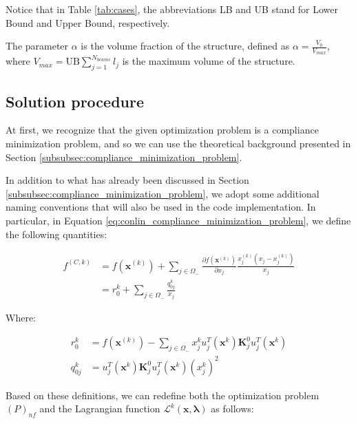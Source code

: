 Notice that in Table \ref{tab:cases}, the abbreviations LB and UB stand for Lower Bound and Upper Bound, respectively.

The parameter $\alpha$ is the volume fraction of the structure, defined as $\alpha = \frac{V_0}{V_{max}}$, where $V_{max} = \text{UB} \sum_{j=1}^{N_{beams}} l_j$ is the maximum volume of the structure.



\subsection{Solution procedure}
\label{subsec:cb_solution_procedure}

At first, we recognize that the given optimization problem is a compliance minimization problem, and so we can use the theoretical background presented in Section \ref{subsubsec:compliance_minimization_problem}.

In addition to what has already been discussed in Section \ref{subsubsec:compliance_minimization_problem}, we adopt some additional naming conventions that will also be used in the code implementation.
In particular, in Equation \ref{eq:conlin_compliance_minimization_problem}, we define the following quantities:

\begin{equation}
    \begin{aligned}
        f^{(C, k)} & = f(\bm{x}^{(k)}) + \sum_{j \in \Omega_-} \frac{\partial f(\bm{x}^{(k)})}{\partial x_j} \frac{x_j^{(k)}(x_j - x_j^{(k)})}{x_j} \\
                   & = r_0^k + \sum_{j \in \Omega_-} \frac{q_{0j}^k}{x_j}
    \end{aligned}
\end{equation}

Where:

\begin{equation}
    \begin{aligned}
        r_0^k    & = f(\bm{x}^{(k)}) - \sum_{j \in \Omega_-}  x_j^k u_j^T(\bm{x}^k) \bm{K}_j^0 u_j^T(\bm{x}^k) \\
        q_{0j}^k & = u_j^T(\bm{x}^k) \bm{K}_j^0 u_j^T(\bm{x}^k) (x_j^k)^2
    \end{aligned}
\end{equation}

Based on these definitions, we can redefine both the optimization problem $(P)_{nf}$ and the Lagrangian function $\mathcal{L}^{k}(\bm{x}, \bm{\lambda})$ as follows:

